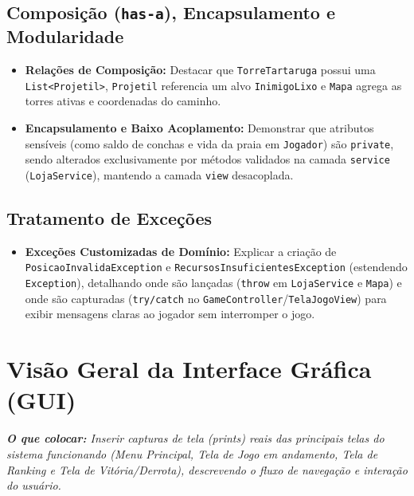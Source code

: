 \documentclass[11pt,a4paper]{article}
\begin{document}
\subsection{Composição (\texttt{has-a}), Encapsulamento e Modularidade}
\begin{itemize}
    \item \textbf{Relações de Composição:} Destacar que \texttt{TorreTartaruga} possui uma \texttt{List<Projetil>}, \texttt{Projetil} referencia um alvo \texttt{InimigoLixo} e \texttt{Mapa} agrega as torres ativas e coordenadas do caminho.
    \item \textbf{Encapsulamento e Baixo Acoplamento:} Demonstrar que atributos sensíveis (como saldo de conchas e vida da praia em \texttt{Jogador}) são \texttt{private}, sendo alterados exclusivamente por métodos validados na camada \texttt{service} (\texttt{LojaService}), mantendo a camada \texttt{view} desacoplada.
\end{itemize}

\subsection{Tratamento de Exceções}
\begin{itemize}
    \item \textbf{Exceções Customizadas de Domínio:} Explicar a criação de \texttt{PosicaoInvalidaException} e \texttt{RecursosInsuficientesException} (estendendo \texttt{Exception}), detalhando onde são lançadas (\texttt{throw} em \texttt{LojaService} e \texttt{Mapa}) e onde são capturadas (\texttt{try/catch} no \texttt{GameController}/\texttt{TelaJogoView}) para exibir mensagens claras ao jogador sem interromper o jogo.
\end{itemize}

\section{Visão Geral da Interface Gráfica (GUI)}
\textit{\textbf{O que colocar:} Inserir capturas de tela (prints) reais das principais telas do sistema funcionando (Menu Principal, Tela de Jogo em andamento, Tela de Ranking e Tela de Vitória/Derrota), descrevendo o fluxo de navegação e interação do usuário.}
\end{document}
